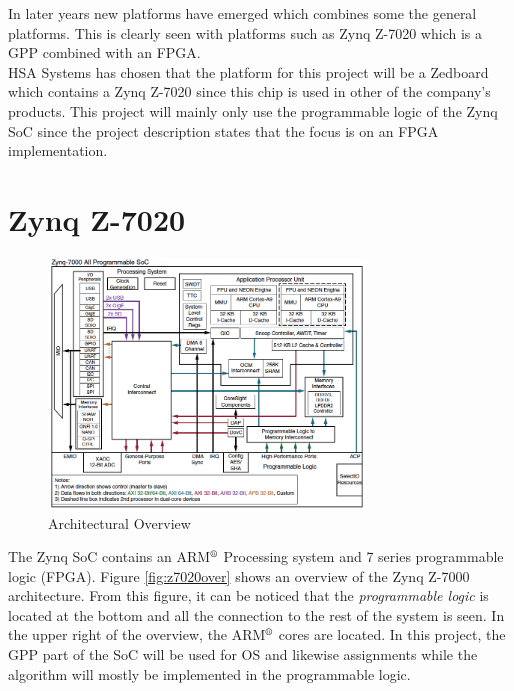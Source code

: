 In later years new platforms have emerged which combines some the general platforms. This is clearly seen with platforms such as Zynq Z-7020 which is a GPP combined with an FPGA.\\ 

HSA Systems has chosen that the platform for this project will be a Zedboard which contains a Zynq Z-7020 since this chip is used in other of the company's products. This project will mainly only use the programmable logic of the Zynq SoC since the project description states that the focus is on an FPGA implementation.

\section{Zynq Z-7020}

\begin{figure}[ht!]
  \centering
  \includegraphics[width=0.75\textwidth]{figures/z7020overview}
  \caption{Architectural Overview \cite{zynq20137000}}
  \label{fig:z7020over}
\end{figure}

The Zynq SoC contains an ARM$^\text{\textregistered}$ Processing system and 7 series programmable logic (FPGA). Figure \vref{fig:z7020over} shows an overview of the Zynq Z-7000 architecture. From this figure, it can be noticed that the \textit{programmable logic} is located at the bottom and all the connection to the rest of the system is seen. In the upper right of the overview, the ARM$^\text{\textregistered}$ cores are located. In this project, the GPP part of the SoC will be used for OS and likewise assignments while the algorithm will mostly be implemented in the programmable logic.

